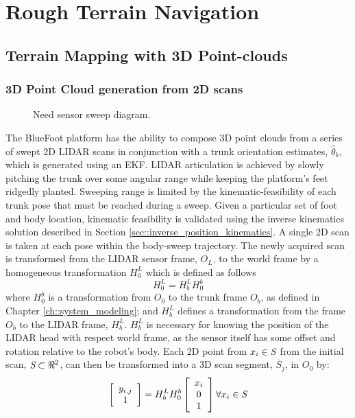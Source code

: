 	\section{Rough Terrain Navigation}

		\subsection{Terrain Mapping with 3D Point-clouds}
			
			\subsubsection{3D Point Cloud generation from 2D scans}
				\begin{figure}[h!]
					\centering
					\caption{Need sensor sweep diagram.}
					\label{fig::sensor_sweep}
				\end{figure}
				The BlueFoot platform has the ability to compose 3D point clouds from a series of swept 2D LIDAR scans in conjunction with a trunk orientation estimates, $\hat{\theta}_{b}$, which is generated using an EKF. LIDAR articulation is achieved by slowly pitching the trunk over some angular range while keeping the platform's feet ridgedly planted. Sweeping range is limited by the kinematic-feasibility of each trunk pose that must be reached during a sweep. Given a particular set of foot and body location, kinematic feasibility is validated using the inverse kinematics solution described in Section \ref{sec::inverse_position_kinematics}. A single 2D scan is taken at each pose within the body-sweep trajectory. The newly acquired scan is transformed from the LIDAR sensor frame, $O_{L}$, to the world frame by a homogeneous transformation $H^{L}_{0}$ which is defined as follows
					\begin{equation}
						H^{L}_{0} = H^{L}_{b} H^{b}_{0}
						\label{eq::world_to_sensor}
					\end{equation}
				where $H^{b}_{0}$ is a transformation from $O_{0}$ to the trunk frame $O_{b}$, as defined in Chapter \ref{ch::system_modeling}; and $H^{L}_{b}$ defines a transformation from the frame $O_{b}$ to the LIDAR frame, $H^{L}_{b}$. $H^{L}_{b}$ is necessary for knowing the position of the LIDAR head with respect world frame, as the sensor itself has some offset and rotation relative to the robot's body. Each 2D point from $x_{i} \in \emph{S}$ from the initial scan, $\emph{S}\subset \Re^{2}$, can then be transformed into a 3D scan segment, $\bar{S}_{j}$, in $O_{0}$ by:
					\begin{equation}
						\left[
							\begin{array}{c}
								y_{i,j} \\ 1
							\end{array}
						\right]
					 = H^{L}_{b} H^{b}_{0}	
						\left[
							\begin{array}{c}
								x_{i} \\ 0 \\ 1
							\end{array}
						\right] \forall x_{i} \in \emph{S}
						\label{eq::scan_to_segment}
					\end{equation}

